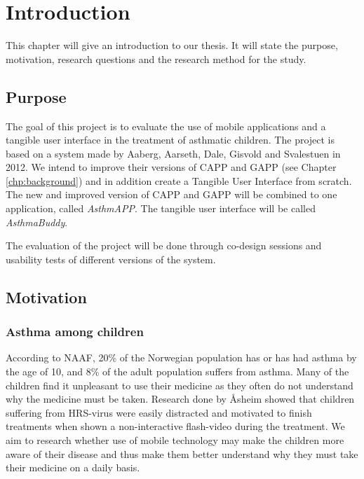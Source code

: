 \chapter{Introduction}
\label{chp:introduction}

This chapter will give an introduction to our thesis. It will state the purpose, motivation, research questions and the research method for the study. 

\section{Purpose}
\label{sec:purpose}
The goal of this project is to evaluate the use of mobile applications and a tangible user interface in the treatment of asthmatic children. The project is based on a system made by Aaberg, Aarseth, Dale, Gisvold and Svalestuen in 2012\cite{CustomerDriven}. We intend to improve their versions of CAPP and GAPP (see Chapter \ref{chp:background}) and in addition create a Tangible User Interface from scratch. The new and improved version of CAPP and GAPP will be combined to one application, called \emph{AsthmAPP}. The tangible user interface will be called \emph{AsthmaBuddy}.

The evaluation of the project will be done through co-design sessions and usability tests of different versions of the system. 
 

\section{Motivation}
\label{sec:motivation}

\subsection{Asthma among children}
According to NAAF, 20\% of the Norwegian population has or has had asthma by the age of 10, and 8\% of the adult population suffers from asthma\cite{NAAF}. Many of the children find it unpleasant to use their medicine as they often do not understand why the medicine must be taken. Research done by \r{A}sheim showed that children suffering from HRS-virus were easily distracted and motivated to finish treatments when shown a non-interactive flash-video during the treatment\cite{Asheim610877}. We aim to research whether use of mobile technology may make the children more aware of their disease and thus make them better understand why they must take their medicine on a daily basis. 


